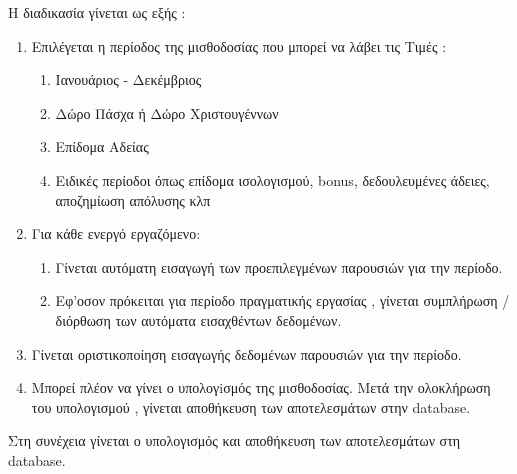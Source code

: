 \documentclass[A4,10pt,greek]{book}
\begin{document}
Η διαδικασία γίνεται ως εξής :
\begin{enumerate} 

\item Επιλέγεται η περίοδος της μισθοδοσίας που μπορεί να λάβει τις Τιμές :
\begin{enumerate} 
\item Ιανουάριος - Δεκέμβριος 
\item Δώρο Πάσχα ή Δώρο Χριστουγέννων
\item Επίδομα Αδείας
\item Ειδικές περίοδοι όπως επίδομα ισολογισμού, bonus, δεδουλευμένες άδειες, αποζημίωση απόλυσης κλπ
\end{enumerate}
\item Για κάθε ενεργό εργαζόμενο:
\begin{enumerate} 
\item Γίνεται αυτόματη εισαγωγή των προεπιλεγμένων παρουσιών για την περίοδο.
\item Εφ'οσον πρόκειται για περίοδο πραγματικής εργασίας , γίνεται συμπλήρωση / διόρθωση των αυτόματα εισαχθέντων δεδομένων.
\end{enumerate}
\item Γίνεται οριστικοποίηση εισαγωγής δεδομένων παρουσιών για την περίοδο.
\item Μπορεί πλέον να γίνει ο υπολογiσμός της μισθοδοσίας. Μετά την ολοκλήρωση του υπολογισμού , γίνεται αποθήκευση των αποτελεσμάτων στην database.

\end{enumerate}

Στη συνέχεια γίνεται ο υπολογισμός και αποθήκευση των αποτελεσμάτων στη database.

 
\end{document}
